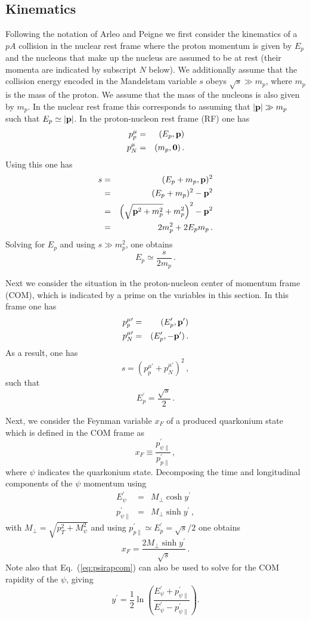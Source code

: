 \documentclass[11pt,onecolumn]{article}
\newcommand{\beq}{\begin{equation}}
\newcommand{\eeq}{\end{equation}}
\newcommand{\bqa}{\begin{eqnarray}}
\newcommand{\eqa}{\end{eqnarray}}
\begin{document}
\subsection{Kinematics}
Following the notation of Arleo and Peigne \cite{Arleo:2012rs} we first consider the kinematics of a $pA$ collision in the nuclear rest frame where the proton momentum is given by $E_p$ and the nucleons  that make up the nucleus are assumed to be at rest (their momenta are indicated by subscript $N$ below).  We additionally assume that the collision energy encoded in the Mandelstam variable $s$ obeys $\sqrt{s} \gg m_p$, where $m_p$ is the mass of the proton.  We assume that the mass of the nucleons is also given by $m_p$.  In the nuclear rest frame this corresponds to assuming that $|{\bf p}| \gg m_p$ such that $E_p \simeq |{\bf p}|$.  In the proton-nucleon rest frame (RF) one has
%
\bqa
p^\mu_p &=& (E_p,{\bf p}) \nonumber \\
p^\mu_N &=& (m_p,{\bf 0}) \, .
\eqa
%
Using this one has
%
\bqa
s &=& (E_p + m_p,{\bf p})^2 \nonumber \\
&=& (E_p + m_p)^2 - {\bf p}^2 \nonumber \\
&=& \left(\sqrt{{\bf p}^2+m_p^2} + m_p^2\right)^2 - {\bf p}^2 \nonumber \\
&=& 2 m_p^2 + 2 E_p m_p \, .
\eqa
%
Solving for $E_p$ and using $s \gg m_p^2$, one obtains
%
\beq
E_p \simeq \frac{s}{2 m_p} \, .
\eeq

Next we consider the situation in the proton-nucleon center of momentum frame (COM), which is indicated by a prime on the variables in this section.  In this frame one has
%
\bqa 
p^{\mu\prime}_p &=& (E_p^\prime,{\bf p}^\prime) \nonumber \\
p^{\mu\prime}_N &=& (E_p^\prime,-{\bf p}^\prime) \, .
\eqa
%
As a result, one has 
%
\beq
s = \left( p^{\mu\prime}_p + p^{\mu\prime}_N \right)^2 \, ,
\eeq
%
such that
%
\beq
E_p^\prime = \frac{\sqrt{s}}{2} \, .
\eeq

Next, we consider the Feynman variable $x_F$ of a produced quarkonium state which is defined in the COM frame as
%
\beq
x_F \equiv \frac{p_{\psi\parallel}^\prime}{p_{p\parallel}^\prime} \, ,
\eeq
% 
where $\psi$ indicates the quarkonium state.  Decomposing the time and longitudinal components of the $\psi$ momentum using
%
\bqa
E_\psi^\prime &=& M_\perp \cosh y^\prime \nonumber \\
p_{\psi\parallel}^\prime &=& M_\perp \sinh y^\prime \, ,
\label{eq:psirapcom}
\eqa
%
with $M_\perp = \sqrt{{p}_T^2 + M_\psi^2}$ and using $p_{p\parallel}^\prime \simeq E_p^\prime = \sqrt{s}/2$ one obtains
%
\beq
x_F = \frac{2 M_\perp \sinh y^\prime}{\sqrt{s}} \, .
\label{eq:xfres2}
\eeq
%
Note also that Eq.~(\ref{eq:psirapcom}) can also be used to solve for the COM rapidity of the $\psi$, giving
%
\beq
y^\prime = \frac{1}{2} \ln \left( \frac{E_\psi^\prime + p_{\psi\parallel}^\prime}{E_\psi^\prime - p_{\psi\parallel}^\prime} \right) .
\eeq
\end{document}
